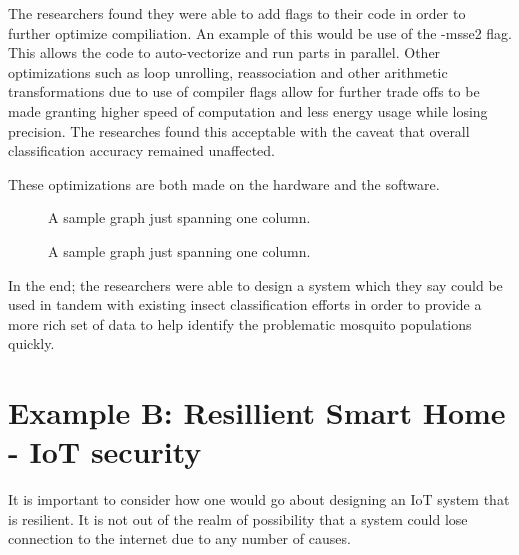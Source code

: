 \documentclass{sig-alternate}
\begin{document}
The researchers found they were able to add flags to their code in order to further optimize compiliation. An example of this would be use of the -msse2 flag. This allows the code to auto-vectorize and run parts in parallel. %
Other optimizations such as loop unrolling, reassociation and other arithmetic transformations due to use of compiler flags allow for further trade offs to be made granting higher speed of computation and less energy usage while losing precision. The researches found this acceptable with the caveat that overall classification accuracy remained unaffected.

These optimizations are both made on the hardware and the software.


\begin{figure}
\centering
{}
\caption{A sample graph just spanning one column.}
\label{fig:singleColumnFigure2}
\end{figure}


\begin{figure}
\centering
{}
\caption{A sample graph just spanning one column.}
\label{fig:singleColumnFigure2}
\end{figure}

In the end; the researchers were able to design a system which they say could be used in tandem with existing insect classification efforts in order to provide a more rich set of data to help identify the problematic mosquito populations quickly.

\section{Example B: Resillient Smart Home - IoT security}
\label{sec:home}


It is important to consider how one would go about designing an IoT system that is resilient. It is not out of the realm of possibility that a system could lose connection to the internet due to any number of causes.
\end{document}
